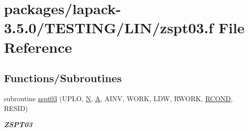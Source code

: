 \hypertarget{zspt03_8f}{}\section{packages/lapack-\/3.5.0/\+T\+E\+S\+T\+I\+N\+G/\+L\+I\+N/zspt03.f File Reference}
\label{zspt03_8f}
\subsection*{Functions/\+Subroutines}
\begin{DoxyCompactItemize}
\item 
subroutine \hyperlink{group__complex16__lin_ga3d55441f4aa7be616d35cea3f4a95ac7}{zspt03} (U\+P\+L\+O, \hyperlink{polmisc_8c_a0240ac851181b84ac374872dc5434ee4}{N}, \hyperlink{classA}{A}, A\+I\+N\+V, W\+O\+R\+K, L\+D\+W, R\+W\+O\+R\+K, \hyperlink{superlu__enum__consts_8h_af00a42ecad444bbda75cde1b64bd7e72a9b5c151728d8512307565994c89919d5}{R\+C\+O\+N\+D}, R\+E\+S\+I\+D)
\begin{DoxyCompactList}\small\item\em {\bfseries Z\+S\+P\+T03} \end{DoxyCompactList}\end{DoxyCompactItemize}
